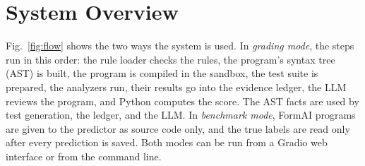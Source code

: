 \documentclass[conference]{IEEEtran}
\begin{document}
\section{System Overview}

Fig.~\ref{fig:flow} shows the two ways the system is used. In \emph{grading
mode}, the steps run in this order: the rule loader checks the rules, the
program's syntax tree (AST) is built, the program is compiled in the sandbox,
the test suite is prepared, the analyzers run, their results go into the
evidence ledger, the LLM reviews the program, and Python computes the score. The
AST facts are used by test generation, the ledger, and the LLM. In
\emph{benchmark mode}, FormAI programs are given to the predictor as source code
only, and the true labels are read only after every prediction is saved. Both modes can be run from
a Gradio web interface or from the command line.
\end{document}
